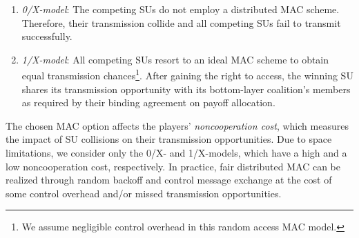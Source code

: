 \documentclass[journal,draftclsnofoot,onecolumn]{IEEEtran}
\theoremstyle{definition}
\begin{document}
\begin{enumerate}
  \item \emph{0/X-model}: The competing SUs do not employ a distributed MAC scheme. Therefore, their transmission collide and all competing SUs fail to transmit successfully.
  \item \emph{1/X-model}: All competing SUs resort to an ideal MAC scheme to obtain equal transmission chances\footnote{We assume negligible control overhead in this random access MAC model.}. After gaining the right to access, the winning SU shares its transmission opportunity with its bottom-layer coalition's members as required by their binding agreement on payoff allocation.
\end{enumerate}
The chosen MAC option affects the players' \emph{noncooperation cost}, which measures the impact of SU collisions on their transmission opportunities. Due to space limitations, we consider only the 0/X- and 1/X-models, which have a high and a low noncooperation cost, respectively. In practice, fair distributed MAC can be realized through random backoff and control message exchange at the cost of some control overhead and/or missed transmission opportunities.
\end{document}
